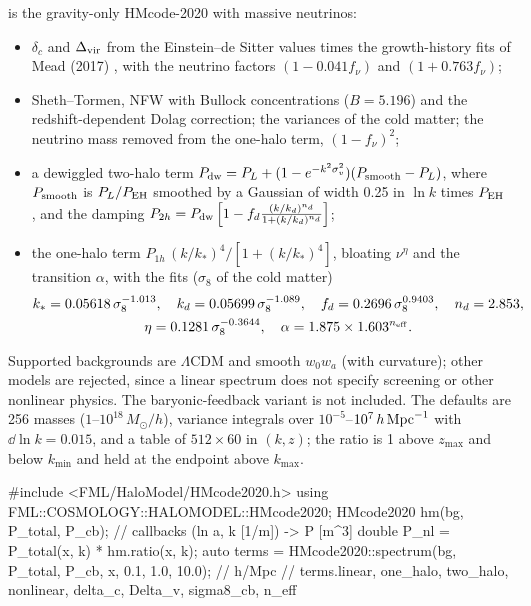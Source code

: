  is the gravity-only HMcode-2020 \cite{Mead2021} with massive neutrinos:
\begin{itemize}
\item $\delta_c$ and $\Delta_{\rm vir}$ from the Einstein--de Sitter values times the growth-history fits of Mead (2017)
      \cite{Mead2017}, with the neutrino factors $(1-0.041f_\nu)$ and $(1+0.763f_\nu)$;
\item Sheth--Tormen, NFW with Bullock concentrations ($B=5.196$) and the redshift-dependent Dolag correction; the variances
      of the cold matter; the neutrino mass removed from the one-halo term, $(1-f_\nu)^2$;
\item a dewiggled two-halo term $P_{\rm dw}=P_L+(1-e^{-k^2\sigma_v^2})(P_{\rm smooth}-P_L)$, where $P_{\rm smooth}$ is
      $P_L/P_{\rm EH}$ smoothed by a Gaussian of width 0.25 in $\ln k$ times $P_{\rm EH}$ \cite{EisensteinHu1998}, and the
      damping $P_{2h}=P_{\rm dw}\left[1-f_d\frac{(k/k_d)^{n_d}}{1+(k/k_d)^{n_d}}\right]$;
\item the one-halo term $P_{1h}\,(k/k_*)^4/[1+(k/k_*)^4]$, bloating $\nu^\eta$ and the transition $\alpha$, with the fits
      ($\sigma_8$ of the cold matter)
      \begin{gather}
      k_*=0.05618\,\sigma_8^{-1.013},\quad k_d=0.05699\,\sigma_8^{-1.089},\quad f_d=0.2696\,\sigma_8^{0.9403},\quad n_d=2.853,\\
      \eta=0.1281\,\sigma_8^{-0.3644},\quad \alpha=1.875\times1.603^{n_{\rm eff}}.
      \end{gather}
\end{itemize}
Supported backgrounds are $\Lambda$CDM and smooth $w_0w_a$ (with curvature); other models are rejected, since a linear
spectrum does not specify screening or other nonlinear physics. The baryonic-feedback variant is not included. The defaults
are 256 masses ($1$--$10^{18}\,M_\odot/h$), variance integrals over $10^{-5}$--$10^7\,h\,\mathrm{Mpc}^{-1}$ with $\dd\ln k=0.015$, and
a table of $512\times60$ in $(k,z)$; the ratio is 1 above $z_{\max}$ and below $k_{\min}$ and held at the endpoint above
$k_{\max}$.

\begin{cppcode}
#include <FML/HaloModel/HMcode2020.h>
using FML::COSMOLOGY::HALOMODEL::HMcode2020;
HMcode2020 hm(bg, P_total, P_cb);          // callbacks (ln a, k [1/m]) -> P [m^3]
double P_nl = P_total(x, k) * hm.ratio(x, k);
auto terms = HMcode2020::spectrum(bg, P_total, P_cb, x, {0.1, 1.0, 10.0});  // h/Mpc
// terms.linear, one_halo, two_halo, nonlinear, delta_c, Delta_v, sigma8_cb, n_eff
\end{cppcode}

